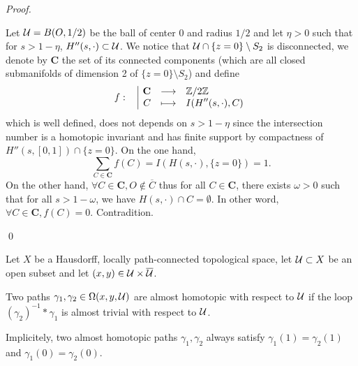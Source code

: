 \begin{proof}
\begin{itemize}
Let $\mathcal{U}=B(O,1/2)$ be the ball of center $0$ and radius $1/2$ and let $\eta>0$ such that for $s>1-\eta$, $H''(s,\cdot)\subset \mathcal{U}$. We notice that $\mathcal{U}\cap \{z=0\}\setminus S_2$ is disconnected, we denote by $\mathbf{C}$ the set of its connected components (which are all closed submanifolds of dimension 2 of $\{z=0\}\setminus S_2$) and define 
$$\displaystyle f:\begin{array}{l|rcl} & \displaystyle \mathbf{C} & \longrightarrow & \displaystyle \mathbb{Z}/2\mathbb{Z} \\ & \displaystyle C & \longmapsto & \displaystyle I(H''(s,\cdot),C) \end{array}$$
 which is well defined, does not depends on $s>1-\eta$ since the intersection number is a homotopic invariant and has finite support by compactness of $H''(s,[0,1])\cap \{z=0\}$. On the one hand, $$\sum_{C\in \mathbf{C}} f(C) = I(H(s,\cdot),\{z=0\})=1.$$
 On the other hand,  
 $\forall C\in \mathbf{C}, O \notin \overline C$ thus for all $C\in {\mathbf{C}}$, there exists $\omega>0$ such that for all $s>1-\omega$, we have $H(s,\cdot)\cap C = \emptyset$. In other word, $\forall C\in \mathbf{C}, f(C)=0$. Contradition. 


 
 
   
 \end{itemize}
\qed\end{proof}

\begin{defi}\label{def:almost_homotopic_paths}
 Let $X$ be a Hausdorff, locally path-connected topological space, let $\mathcal{U}\subset X$ be an open subset and let $(x,y)\in \mathcal{U}\times \overline {\mathcal{U}}$.

Two paths $\gamma_1,\gamma_2 \in \Omega(x,y,\mathcal{U})$ are almost homotopic with respect to $\mathcal{U}$ if the loop $(\gamma_2)^{-1}*\gamma_1$ is almost trivial with respect to $\mathcal{U}$.
\end{defi}

\begin{rem}\label{rem:implicitely_two_almost_homotopic} Implicitely, two almost homotopic paths $\gamma_1,\gamma_2$ always satisfy $\gamma_1(1)=\gamma_2(1)$ and $\gamma_1(0)=\gamma_2(0)$. 
\end{rem}

